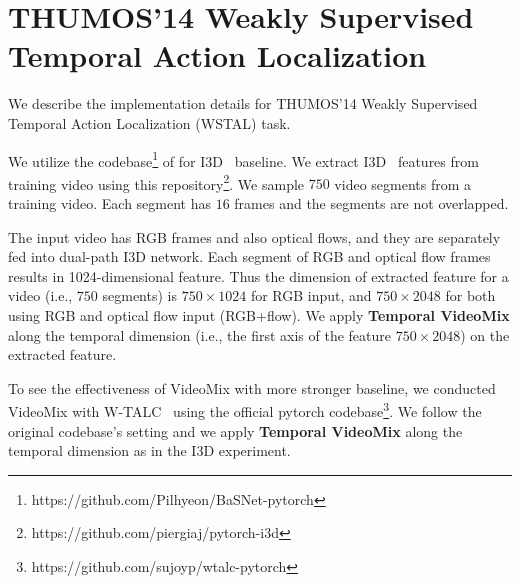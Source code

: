\section{THUMOS'14 Weakly Supervised Temporal Action Localization}
\label{appendix:wstal}

We describe the implementation details for THUMOS'14 Weakly Supervised Temporal Action Localization (WSTAL) task. 

We utilize the codebase\footnote{https://github.com/Pilhyeon/BaSNet-pytorch} of \cite{lee2020bas} for I3D~\cite{carreira2017quo} baseline.
We extract I3D~\cite{carreira2017quo} features from training video using this repository\footnote{https://github.com/piergiaj/pytorch-i3d}.
We sample $750$ video segments from a training video.
Each segment has $16$ frames and the segments are not overlapped. 

The input video has RGB frames and also optical flows, and they are separately fed into dual-path I3D network. 
Each segment of RGB and optical flow frames results in 1024-dimensional feature.
Thus the dimension of extracted feature for a video (i.e., $750$ segments) is $750\times1024$ for RGB input, and $750\times2048$ for both using RGB and optical flow input (RGB+flow).
We apply \textbf{Temporal VideoMix} along the temporal dimension (i.e., the first axis of the feature $750\times2048$) on the extracted feature.

To see the effectiveness of VideoMix with more stronger baseline, we conducted VideoMix with W-TALC~\cite{paul2018w} using the official pytorch codebase\footnote{https://github.com/sujoyp/wtalc-pytorch}. 
We follow the original codebase's setting and we apply \textbf{Temporal VideoMix} along the temporal dimension as in the I3D experiment.  

